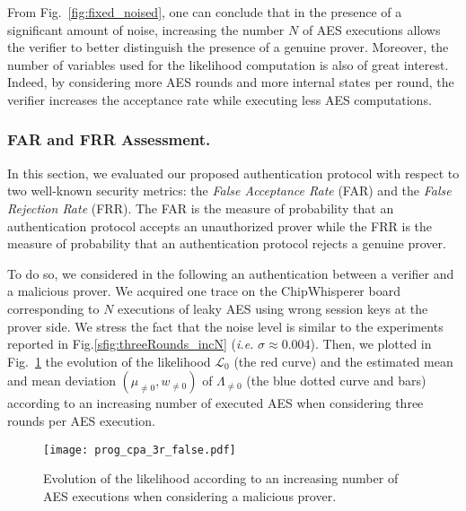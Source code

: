 From Fig.~\ref{fig:fixed_noised}, one can conclude that in the presence of a significant amount of noise, increasing the number $N$ of AES executions allows the verifier to better distinguish the presence of a genuine prover. Moreover, the number of variables used for the likelihood computation is also of great interest. Indeed, by considering more AES rounds and more internal states per round, the verifier increases the acceptance rate while executing less AES computations.



\subsubsection{FAR and FRR Assessment.}\label{ssec:FARFRR}
In this section, we evaluated our proposed authentication protocol with respect to two well-known security metrics: the  \textit{False Acceptance Rate} (FAR) and the \textit{False Rejection Rate} (FRR).
The FAR is the measure of probability that an authentication protocol accepts an unauthorized prover while the FRR is the measure of probability that an authentication protocol rejects a genuine prover.

To do so, we considered in the following an authentication between a verifier and a malicious prover.
We acquired one trace on the ChipWhisperer board corresponding to $N$ executions of leaky AES using wrong session keys at the prover side. We stress the fact that the noise level is similar to the experiments reported in Fig.\ref{sfig:threeRounds_incN} (\emph{i.e.} $\sigma \approx 0.004$). Then, we plotted in Fig.~\ref{fig:proxTest} the evolution of the likelihood $\mathcal{L}_0$ (the red curve) and the estimated mean and mean deviation $(\mu_{\not={0}}, w_{\not={0}})$ of $\Lambda_{\not={0}}$ (the blue dotted curve and bars) according to an increasing number of executed AES when considering three rounds per AES execution.

\begin{figure}[ht!]
\centering
\texttt{[image: prog\_cpa\_3r\_false.pdf]}
\caption{Evolution of the likelihood according to an increasing number of AES executions when considering a malicious prover.}
\label{fig:proxTest}
\end{figure}

